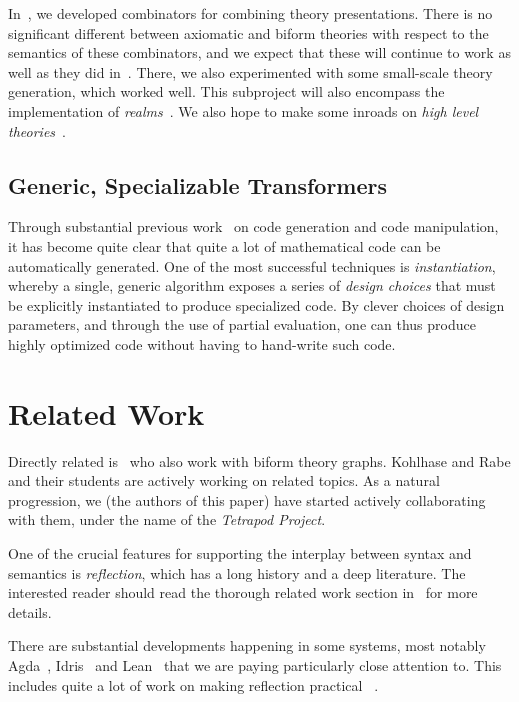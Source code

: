 \documentclass[fleqn]{llncs}
\begin{document}
In~\cite{CaretteOConnorTPC}, we developed combinators for combining
theory presentations. There is no significant different between
axiomatic and biform theories with respect to the semantics of
these combinators, and we expect that these will continue to work
as well as they did in~\cite{MathSchemeExper}. There, we also
experimented with some small-scale theory generation, which worked
well. This subproject will also encompass the implementation of
\emph{realms}~\cite{CaretteEtAl14}.  We also hope to make some
inroads on \emph{high level theories}~\cite{CaretteFarmer08}.

\subsection*{Generic, Specializable Transformers}

Through substantial previous work~%
\cite{CaretteKS09,Carette06,CaElSm11,MathSchemeExper,CaretteKiselyov2005,CaretteKiselyov11,CaretteKucera07,CaretteKucera11,carette2016simplifying,KuceraCarette06,Larjani13,narayanan2016probabilistic}
on code generation and code manipulation, it has become quite clear that
quite a lot of mathematical code can be automatically generated.
One of the most successful techniques is \emph{instantiation},
whereby a single, generic algorithm exposes a series of
\emph{design choices} that must be explicitly instantiated to produce
specialized code. By clever choices of design parameters, and through the
use of partial evaluation, one can thus produce highly optimized code
without having to hand-write such code.

\section{Related Work}

Directly related is~\cite{KohlhaseManceRabe13} who also work with biform theory
graphs. Kohlhase and Rabe and their students are actively working on
related topics. As a natural progression, we (the authors of this paper)
have started actively collaborating with them, under the name of the
\emph{Tetrapod Project}.

One of the crucial features for supporting the interplay between
syntax and semantics is \emph{reflection}, which has a long history
and a deep literature. The interested reader should read the 
thorough related work section in~\cite{Farmer18} for more details.

There are substantial developments happening in some systems, most
notably Agda~\cite{Norell07,Norell09}, Idris~\cite{Brady13} and
Lean~\cite{Lean} that we are paying particularly close attention to.  This includes
quite a lot of work on making reflection practical~%
\cite{Christiansen:2016,Christiansen:2014,ebner2017metaprogramming,VanDerWalt12}.
\end{document}
